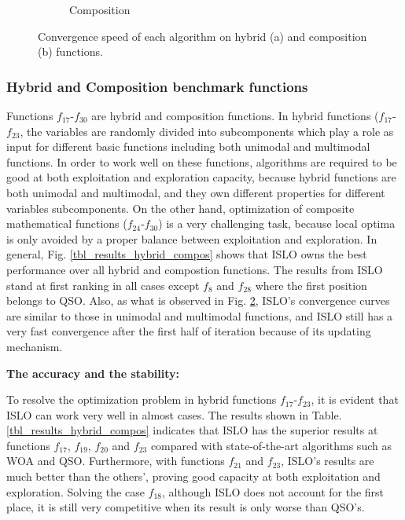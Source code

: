 \documentclass[a4paper,13pt,2p]{report}
\begin{document}
\begin{figure}[!ht]
\begin{subfigure}{0.49\textwidth}
  	 \caption{Composition}
  	\label{subfig:compos_convergence}
  	\end{subfigure}
  \caption{Convergence speed of each algorithm on hybrid (a) and composition (b) functions.} 
  \label{fig_hybrid_compos_convergence} 
\end{figure}
\subsubsection{Hybrid and Composition benchmark functions}

	Functions $f_{17}$-$f_{30}$ are hybrid and composition functions. In hybrid functions ($f_{17}$-$f_{23}$, the variables are randomly divided into subcomponents which play a role as input for different basic functions including both unimodal and multimodal functions. In order to work well on these functions, algorithms are required to be good at both exploitation and exploration capacity, because hybrid functions are both unimodal and multimodal, and they own different properties for different variables subcomponents. On the other hand, optimization of composite mathematical functions ($f_{24}$-$f_{30}$) is a very challenging task, because local optima is only avoided by a proper balance between exploitation and exploration. In general, Fig. \ref{tbl_results_hybrid_compos} shows that ISLO owns the best performance over all hybrid and compostion functions. The results from ISLO stand at first ranking in all cases except $f_8$ and $f_{28}$ where the first position belongs to QSO. Also, as what is observed in Fig. \ref{fig_hybrid_compos_convergence}, ISLO's convergence curves are similar to those in unimodal and multimodal functions, and ISLO still has a very fast convergence after the first half of iteration because of its updating mechanism.
	

	
	\textbf{The accuracy and the stability:} 
	
	To resolve the optimization problem in hybrid functions $f_{17}$-$f_{23}$, it is evident that ISLO can work very well in almost cases. The results shown in Table. \ref{tbl_results_hybrid_compos} indicates that ISLO has the superior results at functions $f_{17}$, $f_{19}$, $f_{20}$ and $f_{23}$ compared with state-of-the-art algorithms such as WOA and QSO. Furthermore, with functions $f_{21}$ and $f_{23}$, ISLO's results are much better than the others', proving good capacity at both exploitation and exploration. Solving the case $f_{18}$, although ISLO does not account for the first place, it is still very competitive when its result is only worse than QSO's.
	
\end{document}
